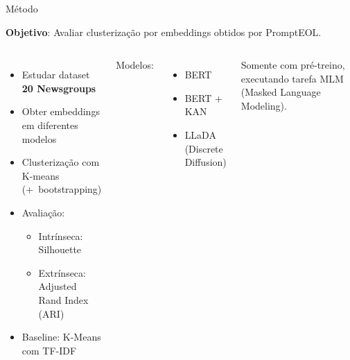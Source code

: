 \documentclass{beamer}
\begin{document}
\begin{frame}{Método}

  \textbf{Objetivo}: Avaliar clusterização por embeddings obtidos por PromptEOL.

	\begin{columns}[t]


    \small
    \begin{itemize}
      \item Estudar dataset \textbf{20 Newsgroups}
      \item Obter embeddings em diferentes modelos
      \item Clusterização com K-means (+~bootstrapping)
      \item Avaliação:

      \begin{itemize}
        \item Intrínseca: Silhouette
        \item Extrínseca: Adjusted Rand Index (ARI)
      \end{itemize}

      \item Baseline: K-Means com TF-IDF
    \end{itemize}


    Modelos:
    \small
    \begin{itemize}
      \item BERT
      \item BERT + KAN
      \item LLaDA (Discrete Diffusion)
    \end{itemize}

    Somente com pré-treino, executando tarefa MLM (Masked Language Modeling).

  \end{columns}

\end{frame}
\end{document}
